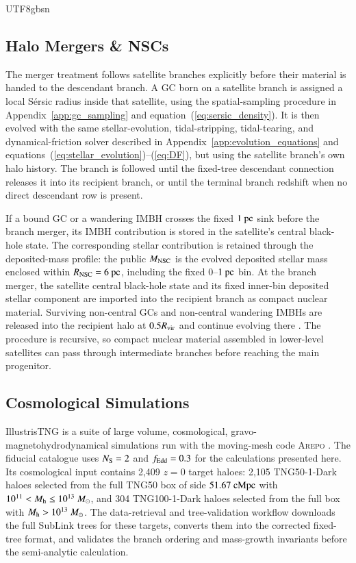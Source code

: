 \documentclass[trackchanges, twocolappendix, twocolumn]{aastex701}
\begin{document}
\begin{CJK*}{UTF8}{gbsn}
\subsection{Halo Mergers \& NSCs} \label{subsect:merge}

The merger treatment follows satellite branches explicitly before their material is handed to the descendant branch. A GC born on a satellite branch is assigned a local S{\'e}rsic radius inside that satellite, using the spatial-sampling procedure in Appendix~\ref{app:gc_sampling} and equation~(\ref{eq:sersic_density}). It is then evolved with the same stellar-evolution, tidal-stripping, tidal-tearing, and dynamical-friction solver described in Appendix~\ref{app:evolution_equations} and equations~(\ref{eq:stellar_evolution})--(\ref{eq:DF}), but using the satellite branch's own halo history. The branch is followed until the fixed-tree descendant connection releases it into its recipient branch, or until the terminal branch redshift when no direct descendant row is present.

If a bound GC or a wandering IMBH crosses the fixed $1~{\rm pc}$ sink before the branch merger, its IMBH contribution is stored in the satellite's central black-hole state. The corresponding stellar contribution is retained through the deposited-mass profile: the public $M_{\rm NSC}$ is the evolved deposited stellar mass enclosed within $R_{\rm NSC}=6~{\rm pc}$, including the fixed $0$--$1~{\rm pc}$ bin. At the branch merger, the satellite central black-hole state and its fixed inner-bin deposited stellar component are imported into the recipient branch as compact nuclear material. Surviving non-central GCs and non-central wandering IMBHs are released into the recipient halo at $0.5R_{\rm vir}$ and continue evolving there \citep{Gao+2024GC}. The procedure is recursive, so compact nuclear material assembled in lower-level satellites can pass through intermediate branches before reaching the main progenitor.

\subsection{Cosmological Simulations} \label{subsect:data}

IllustrisTNG \citep{Nelson+2018TNG, Pillepich+2018TNG, Naiman+2018TNG, Marinacci+2018TNG, Nelson+2019TNG, Pillepich+2019TNG} is a suite of large volume, cosmological, gravo-magnetohydrodynamical simulations run with the moving-mesh code \textsc{Arepo} \citep{Springel2010Arepo, Pakmor+2011Arepo, Pakmor&Springel2013Arepo, Pakmor+2016Arepo, Weinberger+2020Arepo}. The fiducial catalogue uses $N_{\rm S}=2$ and $f_{\rm Edd}=0.3$ for the calculations presented here. Its cosmological input contains 2,409 $z=0$ target haloes: 2,105 TNG50-1-Dark haloes selected from the full TNG50 box of side $51.67~{\rm cMpc}$ with $10^{11}<M_{\rm h}\leq10^{13}~M_\odot$, and 304 TNG100-1-Dark haloes selected from the full box with $M_{\rm h}>10^{13}~M_\odot$. The data-retrieval and tree-validation workflow downloads the full SubLink trees for these targets, converts them into the corrected fixed-tree format, and validates the branch ordering and mass-growth invariants before the semi-analytic calculation.


\end{CJK*}
\end{document}
